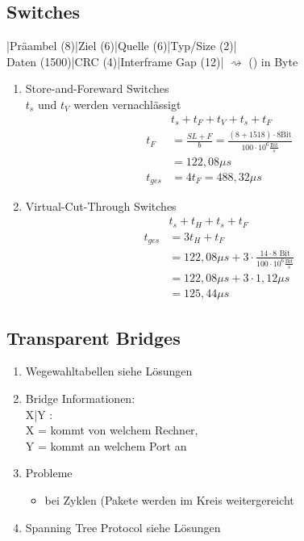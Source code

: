 \subsection{Switches}
	|Präambel (8)|Ziel (6)|Quelle (6)|Typ/Size (2)|\\Daten (1500)|CRC (4)|Interframe Gap (12)| \(\rightsquigarrow \) () in Byte
\begin{enumerate}
	\item Store-and-Foreward Switches \\
	\(t_s \text{ und } t_V\) werden vernachlässigt
	\begin{align*}
	&t_s + t_F + t_V + t_s + t_F\\
	t_F &= \frac{SL +F}{b} = \frac{(8+1518)\cdot 8\text{Bit}}{100 \cdot 10^6 \frac{\text{Bit}}{s}}\\
	&= 122,08 \mu s \\
	t_{ges} &= 4 t_F = 488,32 \mu s
	\end{align*}
	\item Virtual-Cut-Through Switches
	\begin{align*}
	&t_s + t_H + t_s + t_F\\
	t_{ges} &= 3t_H + t_F \\
	&= 122,08 \mu s + 3 \cdot \frac{14 \cdot 8\text{ Bit}}{100 \cdot 10^6 \frac{\text{Bit}}{s}}\\
	&= 122,08 \mu s + 3 \cdot 1,12 \mu s \\
	&= 125,44 \mu s
	\end{align*}
\end{enumerate}
\subsection{Transparent Bridges}
\begin{enumerate}
	\item Wegewahltabellen siehe Lösungen
	\item Bridge Informationen: \\
	X|Y : \\
	X = kommt von welchem Rechner, \\
	Y = kommt an welchem Port an
	\item Probleme 
	\begin{itemize}
		\item bei Zyklen (Pakete werden im Kreis weitergereicht
	\end{itemize}
	\item Spanning Tree Protocol
	siehe Lösungen
\end{enumerate}

